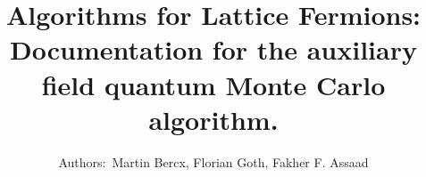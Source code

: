 \documentclass[10pt,Arial]{article}
\begin{document}
\title{{\Huge A}lgorithms for {\Huge L}attice {\Huge F}ermions:  Documentation for the  auxiliary field quantum Monte Carlo  algorithm.}
\author{Authors:~Martin Bercx,  Florian Goth,  Fakher F. Assaad }
\maketitle
\tableofcontents
\clearpage







%
%
%

%
%
%
%
\end{document}
